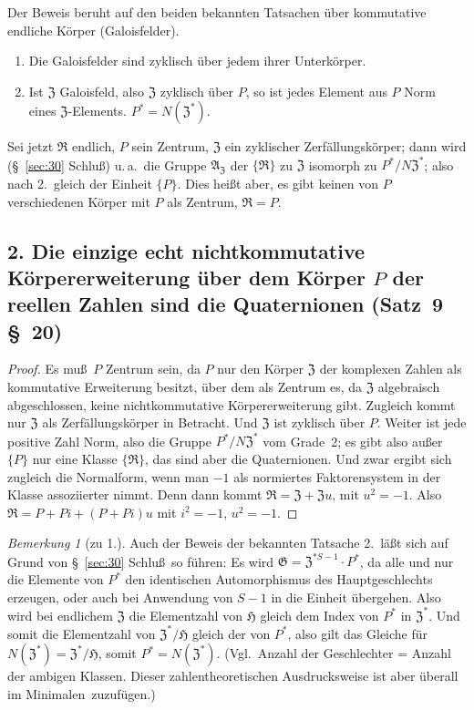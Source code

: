 \documentclass[12pt,a4paper]{article}
\theoremstyle{plain}
\theoremstyle{definition}
\theoremstyle{remark}
\newtheorem{bemerkung}{Bemerkung}[section]
\begin{document}
Der Beweis beruht auf den beiden bekannten Tatsachen \"uber
kommutative endliche K\"orper (Galoisfelder).
\begin{enumerate}
\item Die Galoisfelder sind zyklisch \"uber jedem ihrer Unterk\"orper.
\item Ist $\mathfrak{Z}$ Galoisfeld, also $\mathfrak{Z}$ zyklisch \"uber $P$, so ist jedes
Element aus $P$ Norm eines $\mathfrak{Z}$-Elements. $P^{*} = N(\mathfrak{Z}^{*})$.
\end{enumerate}
Sei jetzt $\mathfrak{R}$ endlich, $P$ sein Zentrum, $\mathfrak{Z}$ ein zyklischer
Zerf\"allungsk\"orper; dann wird (\S~\ref{sec:30} Schlu\ss) u.\,a.\ die Gruppe
$\mathfrak{A}_{\mathfrak{Z}}$ der $\{\mathfrak{R}\}$ zu $\mathfrak{Z}$ isomorph zu
$P^{*}/N\mathfrak{Z}^{*}$; also nach 2.\ gleich der Einheit $\{P\}$. Dies
hei\ss t aber, es gibt keinen von $P$ verschiedenen K\"orper mit $P$ als
Zentrum, $\mathfrak{R} = P$.

\subsection*{2. Die einzige echt nichtkommutative K\"orpererweiterung \"uber dem K\"orper $P$ der reellen Zahlen sind die Quaternionen (Satz~9 \S~20)}

\begin{proof}
Es mu\ss\ $P$ Zentrum sein, da $P$ nur den K\"orper $\mathfrak{Z}$ der
komplexen Zahlen als kommutative Erweiterung besitzt, \"uber dem
als Zentrum es, da $\mathfrak{Z}$ algebraisch abgeschlossen, keine
nichtkommutative K\"orpererweiterung gibt. Zugleich kommt nur
$\mathfrak{Z}$ als Zerf\"allungsk\"orper in Betracht. Und $\mathfrak{Z}$ ist zyklisch
\"uber $P$. Weiter ist jede positive Zahl Norm, also die Gruppe
$P^{*}/N\mathfrak{Z}^{*}$ vom Grade~2; es gibt also au\ss er $\{P\}$ nur eine
Klasse $\{\mathfrak{R}\}$, das sind aber die Quaternionen. Und zwar ergibt
sich zugleich die Normalform, wenn man $-1$ als normiertes
Faktorensystem in der Klasse assoziierter nimmt. Denn dann
kommt $\mathfrak{R} = \mathfrak{Z} + \mathfrak{Z}u$, mit $u^{2} = -1$.
Also $\mathfrak{R} = P + Pi + (P + Pi)u$ mit $i^{2} = -1$, $u^{2} = -1$.
\end{proof}

\begin{bemerkung}[zu 1.]
Auch der Beweis der bekannten Tatsache 2.\ l\"a\ss t sich auf Grund
von \S~\ref{sec:30} Schlu\ss\ so f\"uhren: Es wird $\mathfrak{G} = \mathfrak{Z}^{*S-1} \cdot P^{*}$,
da alle und nur die Elemente von $P^{*}$ den identischen
Automorphismus des Hauptgeschlechts erzeugen, oder auch bei
Anwendung von $S-1$ in die Einheit \"ubergehen. Also wird bei
endlichem $\mathfrak{Z}$ die Elementzahl von $\mathfrak{H}$ gleich dem Index von
$P^{*}$ in $\mathfrak{Z}^{*}$. Und somit die Elementzahl von $\mathfrak{Z}^{*}/\mathfrak{H}$
gleich der von $P^{*}$, also gilt das Gleiche f\"ur
$N(\mathfrak{Z}^{*}) = \mathfrak{Z}^{*}/\mathfrak{H}$, somit $P^{*} = N(\mathfrak{Z}^{*})$.
(Vgl.\ Anzahl der Geschlechter = Anzahl der ambigen Klassen.
Dieser zahlentheoretischen Ausdrucksweise ist aber \"uberall
\glqq im Minimalen\grqq\ zuzuf\"ugen.)
\end{bemerkung}
\end{document}
